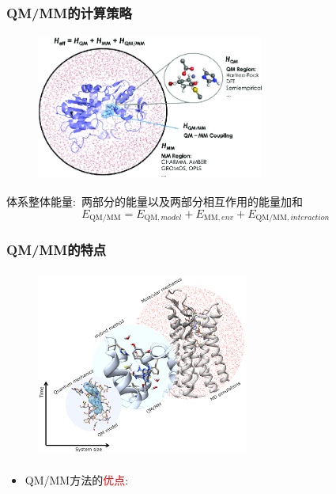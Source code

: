 \frame
{
	\frametitle{\textrm{QM/MM}的计算策略}
\begin{figure}[h!]
\centering
\vspace{-10.5pt}
\includegraphics[height=1.90in,width=2.95in,viewport=0 0 700 450,clip]{Figures/QM-MM-treatment-of-a-biocatalytic-system.png}
\label{QM-MM-biocatalytic}
\end{figure}
体系整体能量:~两部分的能量以及两部分相互作用的能量加和
\begin{displaymath}
	E_{\mathrm{QM/MM}}=E_{\mathrm{QM},model}+E_{\mathrm{MM},env}+E_{\mathrm{QM/MM},interaction}
\end{displaymath}
{\fontsize{6.0pt}{4.2pt}}
}

\frame
{
	\frametitle{\textrm{QM/MM}的特点}
\begin{figure}[h!]
\centering
\vspace{-10.5pt}
\includegraphics[height=2.45in,width=2.75in,viewport=0 0 280 250,clip]{Figures/biomolecules-QM-MM.png}
\label{biomelecules-QM-MM}
\end{figure}
\begin{itemize}
	\item \textrm{QM/MM}方法的\textcolor{red}{优点}:~{\fontsize{8.0pt}{4.2pt}\selectfont{能处理复杂的大分子体系}}\\
		{\fontsize{6.5pt}{4.2pt}}

\end{itemize}
}

